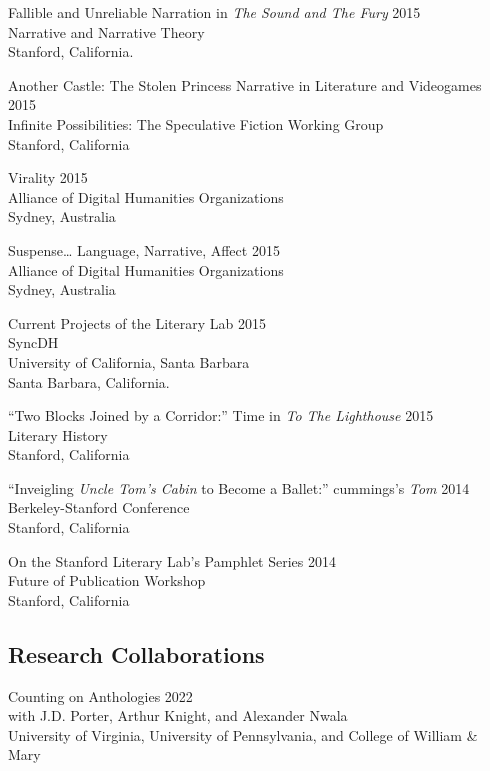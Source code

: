 \documentclass[
  12pt,
  letterpaper,
]{article}
\begin{document}
Fallible and Unreliable Narration in \emph{The Sound and The Fury} \hfill 2015\\
Narrative and Narrative Theory\\
Stanford, California.

Another Castle: The Stolen Princess Narrative in Literature and Videogames \hfill 2015\\
Infinite Possibilities: The Speculative Fiction Working Group\\
Stanford, California

Virality \hfill 2015\\
Alliance of Digital Humanities Organizations\\
Sydney, Australia

Suspense\ldots{} Language, Narrative, Affect \hfill 2015\\
Alliance of Digital Humanities Organizations\\
Sydney, Australia

Current Projects of the Literary Lab \hfill 2015\\
SyncDH\\
University of California, Santa Barbara\\
Santa Barbara, California.

``Two Blocks Joined by a Corridor:'' Time in \emph{To The Lighthouse} \hfill 2015\\
Literary History\\
Stanford, California

``Inveigling \emph{Uncle Tom's Cabin} to Become a Ballet:'' cummings's
\emph{Tom} \hfill 2014\\
Berkeley-Stanford Conference\\
Stanford, California

On the Stanford Literary Lab's Pamphlet Series \hfill 2014\\
Future of Publication Workshop\\
Stanford, California

\hypertarget{research-collaborations}{%
\subsection{Research Collaborations}\label{research-collaborations}}

Counting on Anthologies \hfill 2022\\
with J.D. Porter, Arthur Knight, and Alexander Nwala\\
University of Virginia, University of Pennsylvania, and College of William \& Mary
\end{document}
